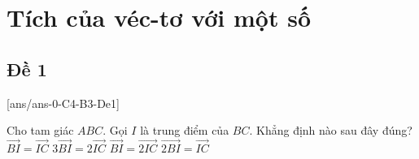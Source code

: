 \section{Tích của véc-tơ với một số}

\subsection{Đề 1}
[ans/ans-0-C4-B3-De1]
\caulc
\begin{ex}%
Cho tam giác $ABC$. Gọi $I$ là trung điểm của $BC$. Khẳng định nào sau đây đúng?
	\choice
		{\True $\overrightarrow{BI}=\overrightarrow{IC}$}
		{$3\overrightarrow{BI}=2\overrightarrow{IC}$}
		{$\overrightarrow{BI}=\overrightarrow{2IC}$}
		{$\overrightarrow{2BI}=\overrightarrow{IC}$}
\end{ex}


